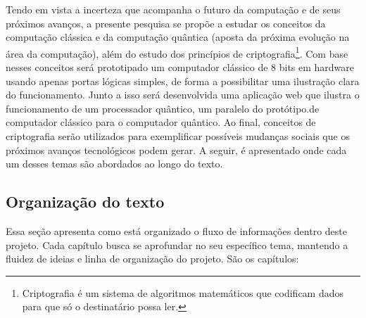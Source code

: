 Tendo em vista a incerteza que acompanha o futuro da computação e de seus próximos avanços, a presente pesquisa se propõe a estudar os conceitos da computação clássica e da computação quântica (aposta da próxima evolução na área da computação), além do estudo dos princípios de criptografia\footnote{Criptografia é um sistema de algoritmos matemáticos que codificam dados para que só o destinatário possa ler.}. Com base nesses conceitos será prototipado um computador clássico de 8 bits em hardware usando apenas portas lógicas simples, de forma a possibilitar uma ilustração clara do funcionamento. Junto a isso será desenvolvida uma aplicação web que ilustra o funcionamento de um processador quântico, um paralelo do protótipo.de computador clássico para o computador quântico. Ao final, conceitos de criptografia serão utilizados para exemplificar possíveis mudanças sociais que os próximos avanços tecnológicos podem gerar. A seguir, é apresentado onde cada um desses temas são abordados ao longo do texto.

\subsection{Organização do texto}
Essa seção apresenta como está organizado o fluxo de informações dentro deste projeto. Cada capítulo busca se aprofundar no seu específico tema, mantendo a fluidez de ideias e linha de organização do projeto. São os capítulos:

